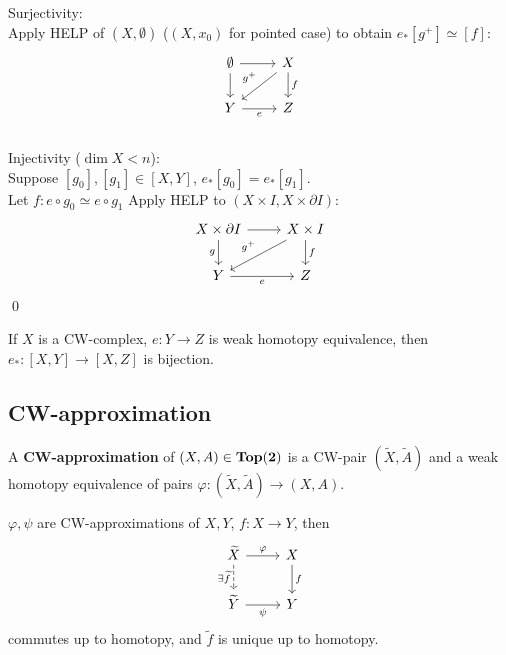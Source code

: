    \begin{prf}
        Surjectivity:\\
        Apply HELP of $(X,\emptyset)$ ($(X,x_0)$ for pointed case) to obtain $e_{\ast} [g^+] \simeq [f] $:
        \[\begin{tikzcd}
            \emptyset & X \\
            Y & Z
            \arrow[from=1-1, to=1-2]
            \arrow["f", from=1-2, to=2-2]
            \arrow[from=1-1, to=2-1]
            \arrow["e"', from=2-1, to=2-2]
            \arrow["{g^+}"', from=1-2, to=2-1]
        \end{tikzcd}\]\\
        Injectivity ($\dim{X} < n$):\\
        Suppose $[g_0],[g_1] \in [X,Y]$, $e_{\ast}[g_0] = e_{\ast}[g_1]$.\\
        Let $f : e \circ g_0 \simeq e \circ g_1$
        Apply HELP to $(X \times I, X  \times \partial I)$:
        \[\begin{tikzcd}
            {X\times \partial I} & {X \times I} \\
            Y & Z
            \arrow[from=1-1, to=1-2]
            \arrow["f", from=1-2, to=2-2]
            \arrow["g"', from=1-1, to=2-1]
            \arrow["e"', from=2-1, to=2-2]
            \arrow["{g^+}"', from=1-2, to=2-1]
        \end{tikzcd}\]
        \qed
    \end{prf}

    \begin{cor}
        If $X$ is a CW-complex, $e : Y \to Z$ is weak homotopy equivalence,
        then $e_{\ast} : [X,Y] \to [X,Z]$ is bijection.
    \end{cor}

    

    \subsection{CW-approximation}

    \begin{defn}
        A \textbf{CW-approximation} of $(X,A) \in \mathbf{Top(2)}$ is a CW-pair $(\widetilde{X}, \widetilde{A})$ and a
        weak homotopy equivalence of pairs $\varphi : (\widetilde{X}, \widetilde{A}) \to (X,A)$.
    \end{defn}

    \begin{lem}
        \label{hyp:funCWapprox}
        $\varphi, \psi$ are CW-approximations of $X,Y$,
        $f : X \to Y$, then 
        \[\begin{tikzcd}
            {\widetilde{X}} & X \\
            {\widetilde{Y}} & Y
            \arrow["{\exists \widetilde{f}}"', dashed, from=1-1, to=2-1]
            \arrow["\varphi", from=1-1, to=1-2]
            \arrow["f", from=1-2, to=2-2]
            \arrow["\psi"', from=2-1, to=2-2]
        \end{tikzcd}\] commutes up to homotopy,
        and $\widetilde{f}$ is unique up to homotopy.
    \end{lem}

